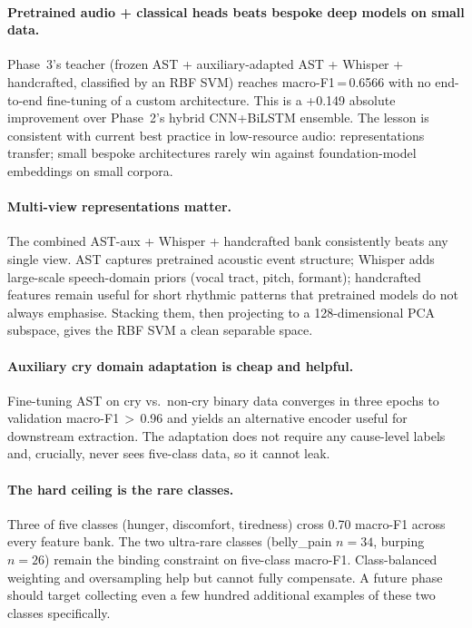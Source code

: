 \documentclass[11pt,a4paper]{article}
\begin{document}
\paragraph{Pretrained audio + classical heads beats bespoke deep models
on small data.}
Phase~3's teacher (frozen AST + auxiliary-adapted AST + Whisper +
handcrafted, classified by an RBF SVM) reaches macro-F1\,=\,0.6566 with
no end-to-end fine-tuning of a custom architecture. This is a +0.149
absolute improvement over Phase~2's hybrid CNN+BiLSTM ensemble. The
lesson is consistent with current best practice in low-resource audio:
representations transfer; small bespoke architectures rarely win against
foundation-model embeddings on small corpora.

\paragraph{Multi-view representations matter.}
The combined AST-aux + Whisper + handcrafted bank consistently beats
any single view. AST captures pretrained acoustic event structure;
Whisper adds large-scale speech-domain priors (vocal tract, pitch,
formant); handcrafted features remain useful for short rhythmic patterns
that pretrained models do not always emphasise. Stacking them, then
projecting to a 128-dimensional PCA subspace, gives the RBF SVM a clean
separable space.

\paragraph{Auxiliary cry domain adaptation is cheap and helpful.}
Fine-tuning AST on cry vs.\ non-cry binary data converges in three
epochs to validation macro-F1\,$>$\,0.96 and yields an alternative
encoder useful for downstream extraction. The adaptation does not
require any cause-level labels and, crucially, never sees five-class
data, so it cannot leak.

\paragraph{The hard ceiling is the rare classes.}
Three of five classes (hunger, discomfort, tiredness) cross 0.70
macro-F1 across every feature bank. The two ultra-rare classes
(belly\_pain $n{=}34$, burping $n{=}26$) remain the binding constraint
on five-class macro-F1. Class-balanced weighting and oversampling help
but cannot fully compensate. A future phase should target collecting
even a few hundred additional examples of these two classes specifically.
\end{document}
